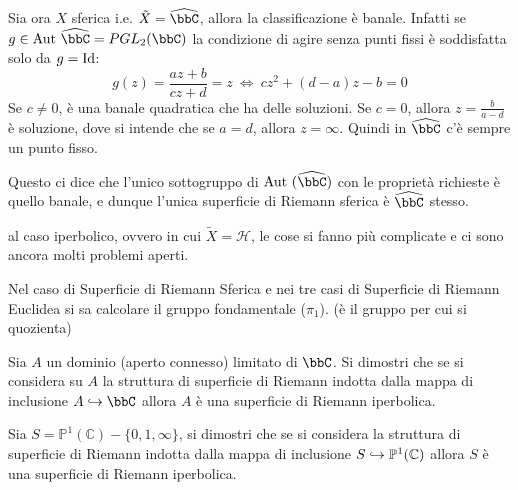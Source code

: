 Sia ora $X$ sferica i.e. $\tilde {X}=\hat{\bbC}$, allora la classificazione è banale. Infatti se $g\in\Aut{\hat{\bbC}}=PGL_2(\bbC)$ la condizione di agire senza punti fissi è soddisfatta solo da $g=\text{Id}$:
$$g(z)=\frac{az+b}{cz+d}=z\ \Leftrightarrow\ cz^2+(d-a)z-b=0$$
Se $c\neq0$, è una banale quadratica che ha delle soluzioni. Se $c=0$, allora $z=\frac{b}{a-d}$ è soluzione, dove si intende che se $a=d$, allora $z=\infty$. Quindi in $\hat{\bbC}$ c'è sempre un punto fisso.

Questo ci dice che l'unico sottogruppo di $\Aut(\hat\bbC)$ con le proprietà richieste è quello banale, e dunque l'unica superficie di Riemann sferica è $\hat\bbC$ stesso.


 al caso iperbolico, ovvero in cui $\tilde X=\mathcal{H}$, le cose si fanno più complicate e ci sono ancora molti problemi aperti.

\begin{osservazione}
Nel caso di Superficie di Riemann Sferica e nei tre casi di Superficie di Riemann Euclidea si sa calcolare il gruppo fondamentale ($\pi_1$). (è il gruppo per cui si quozienta)
\end{osservazione}

\begin{esercizio}
Sia $A$ un dominio (aperto connesso) limitato di $\bbC$. Si dimostri che se si considera su $A$ la struttura di superficie di Riemann indotta dalla mappa di inclusione $A\hrar\bbC$ allora $A$ è una superficie di Riemann iperbolica.
\end{esercizio}



\begin{esercizio}Sia $S=\mathbb{P}^1(\mathbb{C})\minus\{0,1,\infty\}$, si dimostri che se si considera la struttura di superficie di Riemann indotta dalla mappa di inclusione $S\hookrightarrow\mathbb{P}^1(\mathbb{C})$ allora $S$ è una superficie di Riemann iperbolica.
\end{esercizio}


